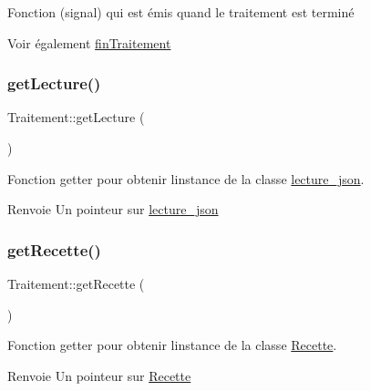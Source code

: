 Fonction (signal) qui est émis quand le traitement est terminé 

\begin{DoxySeeAlso}{Voir également}
\hyperlink{classTraitement_a83495c6e878e66511b8af67ee369a012}{fin\+Traitement} 
\end{DoxySeeAlso}
\mbox{\label{classTraitement_a91ecaaa93bbdc283a3eebe3c060e656d}} 
\subsubsection{\texorpdfstring{get\+Lecture()}{getLecture()}}
{\footnotesize\ttfamily Traitement\+::get\+Lecture (\begin{DoxyParamCaption}{ }\end{DoxyParamCaption})\hspace{0.3cm}{\ttfamily [inline]}}



Fonction getter pour obtenir l\textquotesingle{}instance de la classe \hyperlink{classlecture__json}{lecture\+\_\+json}. 

\begin{DoxyReturn}{Renvoie}
Un pointeur sur \hyperlink{classlecture__json}{lecture\+\_\+json} 
\end{DoxyReturn}
\mbox{\label{classTraitement_a587f76ba51e61307815c9e279821a744}} 
\subsubsection{\texorpdfstring{get\+Recette()}{getRecette()}}
{\footnotesize\ttfamily Traitement\+::get\+Recette (\begin{DoxyParamCaption}{ }\end{DoxyParamCaption})\hspace{0.3cm}{\ttfamily [inline]}}



Fonction getter pour obtenir l\textquotesingle{}instance de la classe \hyperlink{classRecette}{Recette}. 

\begin{DoxyReturn}{Renvoie}
Un pointeur sur \hyperlink{classRecette}{Recette} 
\end{DoxyReturn}
\mbox{\label{classTraitement_a7bbc7e2034b55a9de14c010be7d3de11}} 
